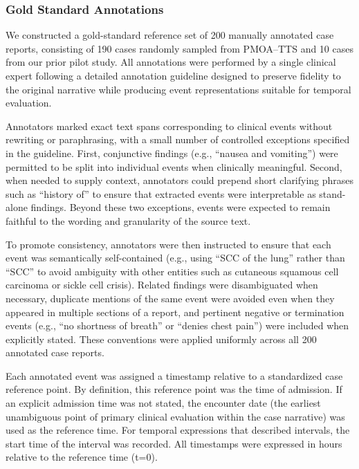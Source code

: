 \documentclass[pdflatex,sn-mathphys-num]{sn-jnl}%
\theoremstyle{thmstyleone}%
\theoremstyle{thmstyletwo}%
\theoremstyle{thmstylethree}%
\begin{document}
\subsubsection{Gold Standard Annotations}
\label{sec:gold-standard-annotations}

We constructed a gold-standard reference set of 200 manually annotated case reports, consisting of 190 cases randomly sampled from PMOA–TTS and 10 cases from our prior pilot study. All annotations were performed by a single clinical expert following a detailed annotation guideline designed to preserve fidelity to the original narrative while producing event representations suitable for temporal evaluation.

Annotators marked exact text spans corresponding to clinical events without rewriting or paraphrasing, with a small number of controlled exceptions specified in the guideline. First, conjunctive findings (e.g., “nausea and vomiting”) were permitted to be split into individual events when clinically meaningful. Second, when needed to supply context, annotators could prepend short clarifying phrases such as “history of” to ensure that extracted events were interpretable as stand-alone findings. Beyond these two exceptions, events were expected to remain faithful to the wording and granularity of the source text.

To promote consistency, annotators were then instructed to ensure that each event was semantically self-contained (e.g., using “SCC of the lung” rather than “SCC” to avoid ambiguity with other
entities such as cutaneous squamous cell carcinoma or sickle cell crisis). Related findings were disambiguated when necessary, duplicate mentions of the same event were avoided even when they appeared in multiple sections of a report, and pertinent negative or termination events (e.g., “no shortness of breath” or “denies chest pain”) were included when explicitly stated. These conventions were applied uniformly across all 200 annotated case reports.

Each annotated event was assigned a timestamp relative to a standardized case reference point. By definition, this reference point was the time of admission. If an explicit admission time was not stated, the encounter date (the earliest unambiguous point of primary clinical evaluation within the case narrative) was used as the reference time. For temporal expressions that described intervals, the start time of the interval was recorded. All timestamps were expressed in hours relative to the reference time (t=0).
\end{document}
